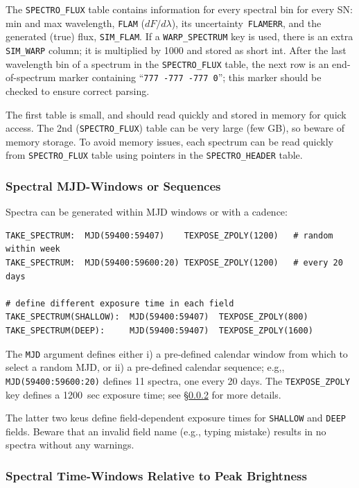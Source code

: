 \documentclass[12pt]{article}
\newcommand{\unc}{uncertainty}
\newcommand{\Flam}{dF/d\lambda}
\begin{document}
The {\tt SPECTRO\_FLUX} table contains information for every spectral 
bin for every SN: 
min and max wavelength,
{\tt FLAM} ($\Flam$), 
its \unc\ {\tt FLAMERR}, 
and the generated (true) flux, {\tt SIM\_FLAM}.
If a {\tt WARP\_SPECTRUM} key is used, 
there is an extra {\tt SIM\_WARP} column;
it is multiplied by 1000 and stored as short int.
After the last wavelength bin of a spectrum in the {\tt SPECTRO\_FLUX}
table,  the next row is an end-of-spectrum marker containing
``{\tt 777  -777  -777  0}''; 
this marker should be checked to ensure correct parsing.

The first table is small, and should read quickly and 
stored in memory for quick access. The 2nd ({\tt SPECTRO\_FLUX}) 
table can be very large (few GB), so beware of memory storage.
To avoid memory issues, each spectrum can be read quickly
from {\tt SPECTRO\_FLUX} table using pointers in the 
{\tt SPECTRO\_HEADER} table.

\subsubsection{Spectral MJD-Windows or Sequences }
\label{sss:SPEC_MJD}

Spectra can be generated within MJD windows or with a cadence:
%
\begin{Verbatim}[frame=single]
TAKE_SPECTRUM:  MJD(59400:59407)    TEXPOSE_ZPOLY(1200)   # random within week
TAKE_SPECTRUM:  MJD(59400:59600:20) TEXPOSE_ZPOLY(1200)   # every 20 days

# define different exposure time in each field
TAKE_SPECTRUM(SHALLOW):  MJD(59400:59407)  TEXPOSE_ZPOLY(800) 
TAKE_SPECTRUM(DEEP):     MJD(59400:59407)  TEXPOSE_ZPOLY(1600) 
\end{Verbatim}
%
The {\tt MJD} argument defines either 
i) a pre-defined calendar window from which to select a random MJD, 
or 
ii) a pre-defined calendar sequence;
e.g,, {\tt MJD(59400:59600:20)} defines 11 spectra, one every 20 days.
The {\tt TEXPOSE\_ZPOLY} key defines a 1200~sec exposure time;
see \S\ref{sss:SPEC_EPOCH} for more details.

The latter two keus define field-dependent exposure times for
{\tt SHALLOW} and {\tt DEEP} fields. Beware that an invalid
field name (e.g., typing mistake) results in no spectra without 
any warnings.


\subsubsection{Spectral Time-Windows Relative to Peak Brightness }
\label{sss:SPEC_EPOCH}
\end{document}
